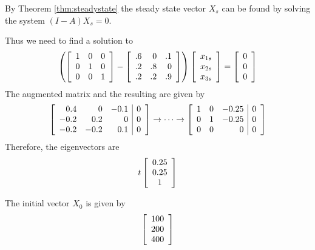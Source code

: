 \begin{solution}
By Theorem \ref{thm:steadystate} the steady state vector $X_s$ can be found by solving the system $(I-A)X_s = 0$. 

Thus we need to find a solution to
\begin{equation*}
\left( \left[
\begin{array}{rrr}
1 & 0 & 0 \\
0 & 1 & 0 \\
0 & 0 & 1
\end{array}
\right] -\left[
\begin{array}{rrr}
.6 & 0 & .1 \\
.2 & .8 & 0 \\
.2 & .2 & .9
\end{array}
\right] \right) \left[
\begin{array}{c}
x_{1s} \\
x_{2s}\\
x_{3s}
\end{array}
\right] =\left[
\begin{array}{c}
0 \\
0 \\
0
\end{array}
\right]
\end{equation*}
The augmented matrix and the resulting {\rref} are given by 
\begin{equation*}
\left[
\begin{array}{rrr|r}
0.4 & 0 & -0.1 & 0 \\
-0.2 & 0.2 & 0 & 0 \\
-0.2 & -0.2 & 0.1 & 0
\end{array}
\right]
\rightarrow \cdots \rightarrow
\left[
\begin{array}{rrr|r}
1 & 0 & -0.25 & 0 \\
0 & 1 & -0.25 & 0 \\
0 & 0 & 0 & 0
\end{array}
\right]
\end{equation*}
Therefore, the eigenvectors are
\begin{equation*}
t\left[
\begin{array}{c}
0.25 \\
0.25 \\
1
\end{array}
\right]
\end{equation*}

The initial vector $X_0$ is given by 
\begin{equation*}
\left[
\begin{array}{r}
100 \\
200 \\
400
\end{array}
\right]
\end{equation*}


\end{solution}
